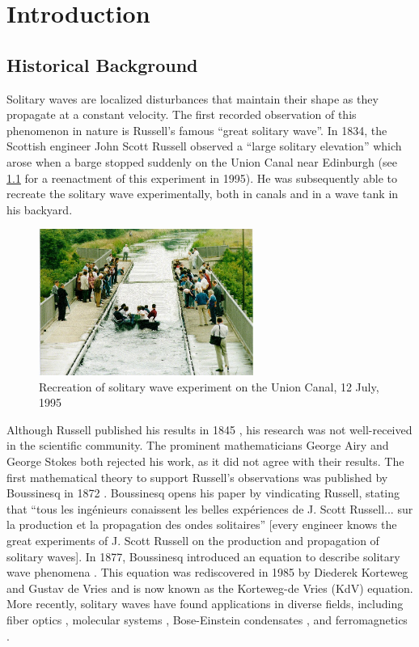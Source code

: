 \documentclass[thesis2.tex]{subfiles}
\begin{document}
\iffulldocument\else
	\chapter{Introduction}
\fi

\section{Historical Background}

Solitary waves are localized disturbances that maintain their shape as they propagate at a constant velocity. The first recorded observation of this phenomenon in nature is Russell's famous ``great solitary wave''. In 1834, the Scottish engineer John Scott Russell observed a ``large solitary elevation'' which arose when a barge stopped suddenly on the Union Canal near Edinburgh (see \cref{fig:canalwave} for a reenactment of this experiment in 1995). He was subsequently able to recreate the solitary wave experimentally, both in canals and in a wave tank in his backyard.  
\begin{figure}
\begin{center}
\includegraphics[width=7cm]{images/intro/solitonHW.jpg}
\caption[Solitary wave experiment]{Recreation of solitary wave experiment on the Union Canal, 12 July, 1995 \cite{Nature1995} }
\label{fig:canalwave}
\end{center}
\end{figure}

Although Russell published his results in 1845 \cite{russell1845}, his research was not well-received in the scientific community. The prominent mathematicians George Airy and George Stokes both rejected his work, as it did not agree with their results. The first mathematical theory to support Russell's observations was published by Boussinesq in 1872 \cite{Boussinesq1872}. Boussinesq opens his paper by vindicating Russell, stating that ``tous les ing{\'e}nieurs conaissent les belles exp{\'e}riences de J. Scott Russell... sur la production et la propagation des ondes solitaires'' [every engineer knows the great experiments of J. Scott Russell on the production and propagation of solitary waves]. In 1877, Boussinesq introduced an equation to describe solitary wave phenomena \cite{boussinesq1877essai}. This equation was rediscovered in 1985 by Diederek Korteweg and Gustav de Vries \cite{KdVoriginal} and is now known as the Korteweg-de Vries (KdV) equation. More recently, solitary waves have found applications in diverse fields, including fiber optics \cite{Taylor1992}, molecular systems \cite{Davydov1985}, Bose-Einstein condensates \cite{Panos2008BEC}, and ferromagnetics \cite{Kosevich1998}.
\end{document}
